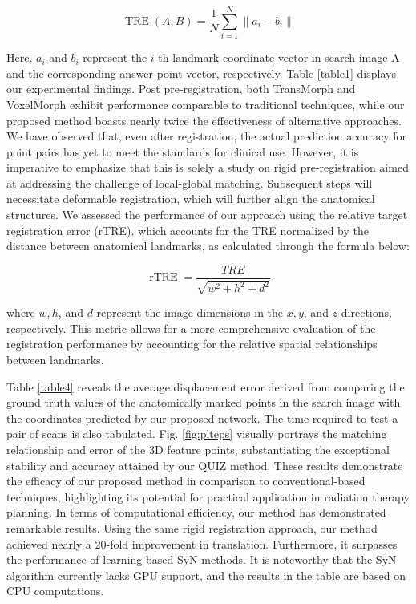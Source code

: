 \documentclass[preprint,review,12pt]{elsarticle}
\begin{document}
\begin{equation}
\operatorname{TRE}(A, B)=\frac{1}{N} \sum_{i=1}^N\left\|a_i-b_i\right\|
\end{equation}

Here, $a_i$ and $b_i$ represent the $i$-th landmark coordinate vector in search image A and the corresponding answer point vector, respectively. Table \ref{table1} displays our experimental findings. Post pre-registration, both TransMorph and VoxelMorph exhibit performance comparable to traditional techniques, while our proposed method boasts nearly twice the effectiveness of alternative approaches. We have observed that, even after registration, the actual prediction accuracy for point pairs has yet to meet the standards for clinical use. However, it is imperative to emphasize that this is solely a study on rigid pre-registration aimed at addressing the challenge of local-global matching. Subsequent steps will necessitate deformable registration, which will further align the anatomical structures. We assessed the performance of our approach using the relative target registration error (rTRE), which accounts for the TRE normalized by the distance between anatomical landmarks, as calculated through the formula below:

\begin{equation}
\operatorname{rTRE}=\frac{T R E}{\sqrt{w^2+h^2+d^2}}
\end{equation}

where $w, h$, and $d$ represent the image dimensions in the $x, y$, and $z$ directions, respectively. This metric allows for a more comprehensive evaluation of the registration performance by accounting for the relative spatial relationships between landmarks.


Table \ref{table4} reveals the average displacement error derived from comparing the ground truth values of the anatomically marked points in the search image with the coordinates predicted by our proposed network. The time required to test a pair of scans is also tabulated. Fig. \ref{fig:plteps} visually portrays the matching relationship and error of the 3D feature points, substantiating the exceptional stability and accuracy attained by our QUIZ method. These results demonstrate the efficacy of our proposed method in comparison to conventional-based techniques, highlighting its potential for practical application in radiation therapy planning. In terms of computational efficiency, our method has demonstrated remarkable results. Using the same rigid registration approach, our method achieved nearly a 20-fold improvement in translation. Furthermore, it surpasses the performance of learning-based SyN\cite{avants2008symmetric} methods. It is noteworthy that the SyN\cite{avants2008symmetric} algorithm currently lacks GPU support, and the results in the table are based on CPU computations.
\end{document}
